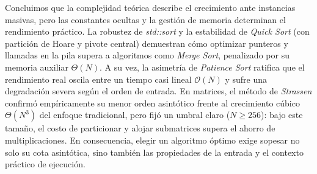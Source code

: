 Concluimos que la complejidad teórica describe el crecimiento ante instancias masivas, pero las constantes ocultas y la gestión de memoria determinan el rendimiento práctico. La robustez de \textit{std::sort} y la estabilidad de \textit{Quick Sort} (con partición de Hoare y pivote central) demuestran cómo optimizar punteros y llamadas en la pila supera a algoritmos como \textit{Merge Sort}, penalizado por su memoria auxiliar $\Theta(N)$. A su vez, la asimetría de \textit{Patience Sort} ratifica que el rendimiento real oscila entre un tiempo casi lineal $\mathcal{O}(N)$ y sufre una degradación severa según el orden de entrada. En matrices, el método de \textit{Strassen} confirmó empíricamente su menor orden asintótico frente al crecimiento cúbico $\Theta(N^3)$ del enfoque tradicional, pero fijó un umbral claro ($N \ge 256$): bajo este tamaño, el costo de particionar y alojar submatrices supera el ahorro de multiplicaciones. En consecuencia, elegir un algoritmo óptimo exige sopesar no solo su cota asintótica, sino también las propiedades de la entrada y el contexto práctico de ejecución.